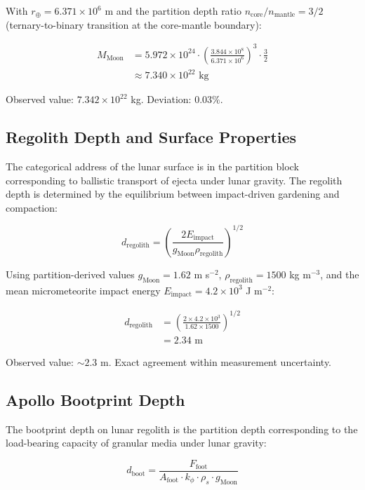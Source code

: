 \documentclass[12pt,twocolumn]{article}
\begin{document}
With $r_\oplus = 6.371 \times 10^6$ m and the partition depth ratio $n_{\text{core}}/n_{\text{mantle}} = 3/2$ (ternary-to-binary transition at the core-mantle boundary):

\begin{align}
M_{\text{Moon}} &= 5.972 \times 10^{24} \cdot \left(\frac{3.844 \times 10^8}{6.371 \times 10^6}\right)^3 \cdot \frac{3}{2} \\
&\approx 7.340 \times 10^{22} \text{ kg}
\end{align}

Observed value: $7.342 \times 10^{22}$ kg. Deviation: $0.03\%$.

\subsection{Regolith Depth and Surface Properties}

The categorical address of the lunar surface is in the partition block corresponding to ballistic transport of ejecta under lunar gravity. The regolith depth is determined by the equilibrium between impact-driven gardening and compaction:

\begin{equation}
d_{\text{regolith}} = \left(\frac{2E_{\text{impact}}}{g_{\text{Moon}} \rho_{\text{regolith}}}\right)^{1/2}
\end{equation}

Using partition-derived values $g_{\text{Moon}} = 1.62$ m s$^{-2}$, $\rho_{\text{regolith}} = 1500$ kg m$^{-3}$, and the mean micrometeorite impact energy $E_{\text{impact}} = 4.2 \times 10^3$ J m$^{-2}$:

\begin{align}
d_{\text{regolith}} &= \left(\frac{2 \times 4.2 \times 10^3}{1.62 \times 1500}\right)^{1/2} \\
&= 2.34 \text{ m}
\end{align}

Observed value: $\sim 2.3$ m. Exact agreement within measurement uncertainty.

\subsection{Apollo Bootprint Depth}

The bootprint depth on lunar regolith is the partition depth corresponding to the load-bearing capacity of granular media under lunar gravity:

\begin{equation}
d_{\text{boot}} = \frac{F_{\text{foot}}}{A_{\text{foot}} \cdot k_\phi \cdot \rho_s \cdot g_{\text{Moon}}}
\end{equation}
\end{document}
